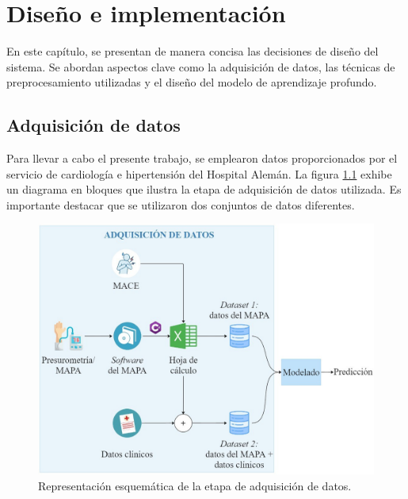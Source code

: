 \chapter{Diseño e implementación} %

\label{Chapter3} %

En este capítulo, se presentan de manera concisa las decisiones de diseño del sistema. 
Se abordan aspectos clave como la adquisición de datos, las técnicas de preprocesamiento 
utilizadas y el diseño del modelo de aprendizaje profundo. 

\section{Adquisición de datos}
 
\newcommand{\myhash}{\raisebox{\depth}{\#}}

Para llevar a cabo el presente trabajo, se emplearon datos proporcionados por el servicio 
de cardiología e hipertensión del Hospital Alemán. La figura \ref{fig:adquisicion_datos} 
exhibe un diagrama en bloques que ilustra la etapa de adquisición de datos utilizada. 
Es importante destacar que se utilizaron dos conjuntos de datos diferentes. 

\begin{figure}[H]
	\centering
	\includegraphics[width=\textwidth]{./Figures/adquisicion_datos2.jpg}
	\caption{Representación esquemática de la etapa de adquisición de datos.}\label{fig:adquisicion_datos}
\end{figure}

